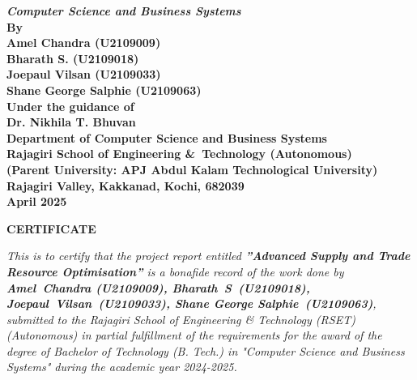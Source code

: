 \begin{center}
	{\Large \bf \itshape{{Computer Science and Business Systems}}}\\[0.7cm]
	\large \bfseries{By}\\[.1cm]
	\large \bfseries{Amel Chandra (U2109009)}\\[0.2cm]
	\large \bfseries{Bharath S. (U2109018)}\\[0.2cm]
	\large \bfseries{Joepaul Vilsan (U2109033)}\\[0.2cm]
	\large \bfseries{Shane George Salphie (U2109063)}\\[0.2cm]
	\large \bfseries{Under the guidance of}\\[0.3cm]
	\large \bfseries{Dr. Nikhila T. Bhuvan}\\[0.2cm]
	\large \textbf{Department of Computer Science and Business Systems}\\
	\large \textbf{Rajagiri School of Engineering \&\ Technology (Autonomous)}\\
	\small \bfseries{(Parent University: APJ Abdul Kalam Technological University)}\\
	\large \textbf{Rajagiri Valley, Kakkanad, Kochi, 682039}\\[0.2cm]
	\large \bfseries{April 2025}
\end{center}

\newpage
\thispagestyle{empty}
\vspace{1cm}
\begin{center}

	\large \bfseries{\huge{CERTIFICATE}}\\[1cm]
\end{center}

\renewcommand{\baselinestretch}{1.2}\normalsize

\sloppy
\emph{This is to certify that the project report entitled \textbf{”Advanced Supply and Trade Resource Optimisation”} is a bonafide record of the work done by \textbf{\mbox{Amel Chandra} (U2109009), \mbox{Bharath S (U2109018)}, \mbox{Joepaul Vilsan (U2109033)}, \mbox{Shane} \mbox{George} \mbox{Salphie (U2109063)}}, submitted to the Rajagiri School of Engineering \& Technology (RSET) (Autonomous) in partial fulfillment of the requirements for the award of the degree of Bachelor of Technology (B. Tech.) in "Computer Science and Business Systems" during the academic year 2024-2025.}\\[2.5cm]

